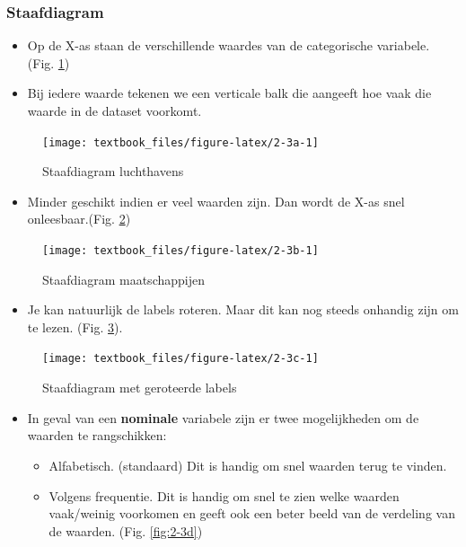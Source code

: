 \documentclass[]{tufte-book}
\providecommand{\tightlist}{%
  \setlength{\itemsep}{0pt}\setlength{\parskip}{0pt}}
\begin{document}
\hypertarget{staafdiagram}{%
\subsubsection{Staafdiagram}\label{staafdiagram}}

\begin{itemize}
\tightlist
\item
  Op de X-as staan de verschillende waardes van de categorische variabele. (Fig. \ref{fig:2-3a})
\item
  Bij iedere waarde tekenen we een verticale balk die aangeeft hoe vaak die waarde in de dataset voorkomt.
\end{itemize}

\begin{figure}
\texttt{[image: textbook\_files/figure-latex/2-3a-1]} \caption[Staafdiagram luchthavens]{Staafdiagram luchthavens}\label{fig:2-3a}
\end{figure}

\begin{itemize}
\tightlist
\item
  Minder geschikt indien er veel waarden zijn. Dan wordt de X-as snel onleesbaar.(Fig. \ref{fig:2-3b})
\end{itemize}

\begin{figure}
\texttt{[image: textbook\_files/figure-latex/2-3b-1]} \caption[Staafdiagram maatschappijen]{Staafdiagram maatschappijen}\label{fig:2-3b}
\end{figure}

\begin{itemize}
\tightlist
\item
  Je kan natuurlijk de labels roteren. Maar dit kan nog steeds onhandig zijn om te lezen. (Fig. \ref{fig:2-3c}).
\end{itemize}

\begin{figure}
\texttt{[image: textbook\_files/figure-latex/2-3c-1]} \caption[Staafdiagram met geroteerde labels]{Staafdiagram met geroteerde labels}\label{fig:2-3c}
\end{figure}

\begin{itemize}
\tightlist
\item
  In geval van een \textbf{nominale} variabele zijn er twee mogelijkheden om de waarden te rangschikken:

  \begin{itemize}
  \tightlist
  \item
    Alfabetisch. (standaard) Dit is handig om snel waarden terug te vinden.
  \item
    Volgens frequentie. Dit is handig om snel te zien welke waarden vaak/weinig voorkomen en geeft ook een beter beeld van de verdeling van de waarden. (Fig. \ref{fig:2-3d})
  \end{itemize}
\end{itemize}
\end{document}
